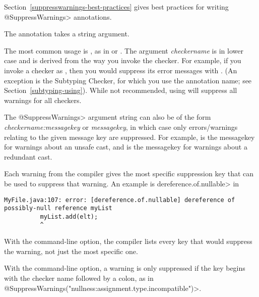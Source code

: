 Section~\ref{suppresswarnings-best-practices} gives best practices for
writing \<@SuppressWarnings> annotations.



The  annotation takes a string argument.

The most common usage is , as
in  or
.  The argument \emph{checkername} is
in lower case and is derived from the way you invoke the checker.  For
example, if you invoke a checker as
,
then you would suppress its error messages with
.  (An exception is the Subtyping
Checker, for which you use the annotation name; see
Section~\ref{subtyping-using}).  While not recommended, using
 will suppress all warnings for all
checkers.

The \<@SuppressWarnings> argument string can also  be of the form
\emph{checkername:messagekey} or \emph{messagekey}, in which case only
errors/warnings relating to the given message key are suppressed.  For example,
 is the messagekey for warnings about an unsafe cast, and
 is the messagekey for warnings about a redundant cast.

Each warning from the compiler gives the most specific
suppression key that can be used to suppress that warning.
An example is \<dereference.of.nullable> in

\begin{smaller}
\begin{Verbatim}
MyFile.java:107: error: [dereference.of.nullable] dereference of possibly-null reference myList
          myList.add(elt);
          ^
\end{Verbatim}
\end{smaller}

\noindent
With the  command-line option,
the compiler lists every key that would suppress the warning,
not just the most specific one.

With the  command-line
option, a warning is only suppressed if the key begins with the checker
name followed by a colon, as in
\<@SuppressWarnings("nullness:assignment.type.incompatible")>.

